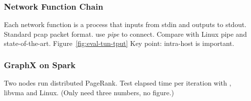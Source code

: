 \subsubsection{Network Function Chain}
\quad

Each network function is a process that inputs from stdin and outputs to stdout. Standard pcap packet format. use \emph{pipe} to connect. Compare with Linux pipe and state-of-the-art. Figure~\ref{fig:eval-tun-tput}
Key point: intra-host is important.

\subsubsection{GraphX on Spark}
\quad

Two nodes run distributed PageRank.
Test elapsed time per iteration with \sys{}, libvma and Linux. (Only need three numbers, no figure.)